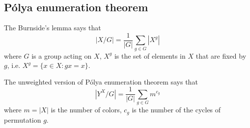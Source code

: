 \subsection{P\'olya enumeration theorem}
The Burnside's lemma says that
$$ |X / G| = \frac{1}{|G|} \sum_{g \in G} |X^g| $$
where $G$ is a group acting on $X$, $X^g$ is the set of elements in $X$ that are fixed by $g$, i.e. $X^g = \{x \in X : gx = x\}$. \par
The unweighted version of P\'olya enumeration theorem says that
$$ |Y^X / G| = \frac{1}{|G|} \sum_{g \in G} m^{c_g} $$
where $m = |X|$ is the number of colors, $c_g$ is the number of the cycles of permutation $g$.

